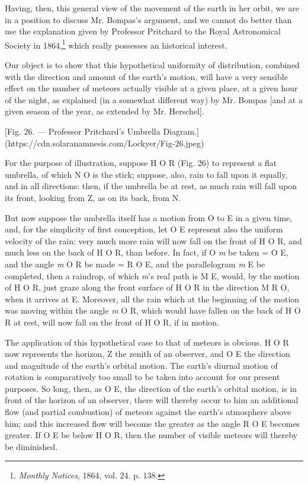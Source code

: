 \documentclass[a4paper, 12pt, oneside, polutonikogreek, english]{article}
\begin{document}
Having, then, this general view of the movement of the earth in her orbit, we are in a position to discuss Mr. Bompas's argument, and we cannot do better than use the explanation given by Professor Pritchard to the Royal Astronomical Society in 1864,\footnote{\emph{Monthly Notices}, 1864, vol. 24. p. 138.} which really possesses an historical interest.

Our object is to show that this hypothetical uniformity of distribution, combined with the direction and amount of the earth's motion, will have a very sensible effect on the number of meteors actually visible at a given place, at a given hour of the night, as explained (in a somewhat different way) by Mr. Bompas [and at a given season of the year, as extended by Mr. Herschel].

[Fig. 26. --- Professor Pritchard's Umbrella Diagram.](https://cdn.solaranamnesis.com/Lockyer/Fig-26.jpeg)

For the purpose of illustration, suppose H O R (Fig. 26) to represent a flat umbrella, of which N O is the stick; suppose, also, rain to fall upon it equally, and in all directions: then, if the umbrella be at rest, as much rain will fall upon its front, looking from Z, as on its back, from N.

But now suppose the umbrella itself has a motion from O to E in a given time, and, for the simplicity of first conception, let O E represent also the uniform velocity of the rain: very much more rain will now fall on the front of H O R, and much less on the back of H O R, than before. In fact, if O \emph{m} be taken = O E, and the angle \emph{m} O R be made = R O E, and the parallelogram \emph{m} E be completed, then a raindrop, of which \emph{m}'s real path is M E, would, by the motion of H O R, just graze along the front surface of H O R in the direction M R O, when it arrives at E. Moreover, all the rain which at the beginning of the motion was moving within the angle \emph{m} O R, which would have fallen on the back of H O R at rest, will now fall on the front of H O R, if in motion.

The application of this hypothetical case to that of meteors is obvious. H O R now represents the horizon, Z the zenith of an observer, and O E the direction and magnitude of the earth's orbital motion. The earth's diurnal motion of rotation is comparatively too small to be taken into account for our present purposes. So long, then, as O E, the direction of the earth's orbital motion, is in front of the horizon of an observer, there will thereby occur to him an additional flow (and partial combustion) of meteors against the earth's atmosphere above him; and this increased flow will become the greater as the angle R O E becomes greater. If O E be below H O R, then the number of visible meteors will thereby be diminished.
\end{document}
